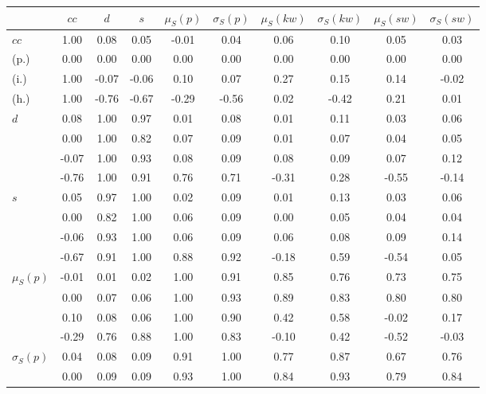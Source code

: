 \begin{table*}[h!]
\begin{center}
\begin{tabular}{| l | c | c | c | c | c | c | c | c | c |}\hline
 & $cc$ & $d$ & $s$ & $\mu_S(p)$ & $\sigma_S(p)$ & $\mu_S(kw)$ & $\sigma_S(kw)$ & $\mu_S(sw)$ & $\sigma_S(sw)$ \\\hline
$cc$ & 1.00  & 0.08  & 0.05  & -0.01  & 0.04  & 0.06  & 0.10  & 0.05  & 0.03 \\\hline
(p.) & 0.00  & 0.00  & 0.00  & 0.00  & 0.00  & 0.00  & 0.00  & 0.00  & 0.00 \\\hline
(i.) & 1.00  & -0.07  & -0.06  & 0.10  & 0.07  & 0.27  & 0.15  & 0.14  & -0.02 \\\hline
(h.) & 1.00  & -0.76  & -0.67  & -0.29  & -0.56  & 0.02  & -0.42  & 0.21  & 0.01 \\\hline
$d$ & 0.08  & 1.00  & 0.97  & 0.01  & 0.08  & 0.01  & 0.11  & 0.03  & 0.06 \\\hline
 & 0.00  & 1.00  & 0.82  & 0.07  & 0.09  & 0.01  & 0.07  & 0.04  & 0.05 \\\hline
 & -0.07  & 1.00  & 0.93  & 0.08  & 0.09  & 0.08  & 0.09  & 0.07  & 0.12 \\\hline
 & -0.76  & 1.00  & 0.91  & 0.76  & 0.71  & -0.31  & 0.28  & -0.55  & -0.14 \\\hline
$s$ & 0.05  & 0.97  & 1.00  & 0.02  & 0.09  & 0.01  & 0.13  & 0.03  & 0.06 \\\hline
 & 0.00  & 0.82  & 1.00  & 0.06  & 0.09  & 0.00  & 0.05  & 0.04  & 0.04 \\\hline
 & -0.06  & 0.93  & 1.00  & 0.06  & 0.09  & 0.06  & 0.08  & 0.09  & 0.14 \\\hline
 & -0.67  & 0.91  & 1.00  & 0.88  & 0.92  & -0.18  & 0.59  & -0.54  & 0.05 \\\hline
$\mu_S(p)$ & -0.01  & 0.01  & 0.02  & 1.00  & 0.91  & 0.85  & 0.76  & 0.73  & 0.75 \\\hline
 & 0.00  & 0.07  & 0.06  & 1.00  & 0.93  & 0.89  & 0.83  & 0.80  & 0.80 \\\hline
 & 0.10  & 0.08  & 0.06  & 1.00  & 0.90  & 0.42  & 0.58  & -0.02  & 0.17 \\\hline
 & -0.29  & 0.76  & 0.88  & 1.00  & 0.83  & -0.10  & 0.42  & -0.52  & -0.03 \\\hline
$\sigma_S(p)$ & 0.04  & 0.08  & 0.09  & 0.91  & 1.00  & 0.77  & 0.87  & 0.67  & 0.76 \\\hline
 & 0.00  & 0.09  & 0.09  & 0.93  & 1.00  & 0.84  & 0.93  & 0.79  & 0.84 \\\hline

\end{tabular}
\end{center}
\end{table*}
